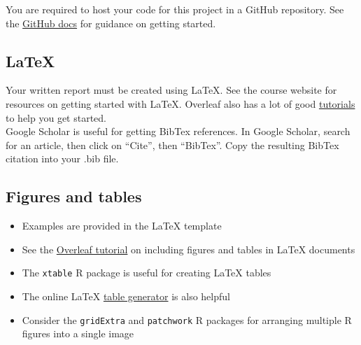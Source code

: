 \documentclass[11pt]{article}
\begin{document}
You are required to host your code for this project in a GitHub repository. See the \href{https://docs.github.com/en/get-started/quickstart/hello-world}{GitHub docs} for guidance on getting started.

\subsection*{LaTeX}

Your written report must be created using LaTeX. See the course website for resources on getting started with LaTeX. Overleaf also has a lot of good \href{https://www.overleaf.com/learn/latex/Tutorials}{tutorials} to help you get started.\\

\noindent Google Scholar is useful for getting BibTex references. In Google Scholar, search for an article, then click on ``Cite'', then ``BibTex''. Copy the resulting BibTex citation into your .bib file.

\subsection*{Figures and tables}

\begin{itemize}
\item Examples are provided in the LaTeX template
\item See the \href{https://www.overleaf.com/learn/latex/How_to_Write_a_Thesis_in_LaTeX_(Part_3)\%3A_Figures\%2C_Subfigures_and_Tables}{Overleaf tutorial} on including figures and tables in LaTeX documents
\item The \verb;xtable; R package is useful for creating LaTeX tables
\item The online LaTeX \href{https://www.tablesgenerator.com/}{table generator} is also helpful
\item Consider the \verb;gridExtra; and \verb;patchwork; R packages for arranging multiple R figures into a single image
\end{itemize}
\end{document}
